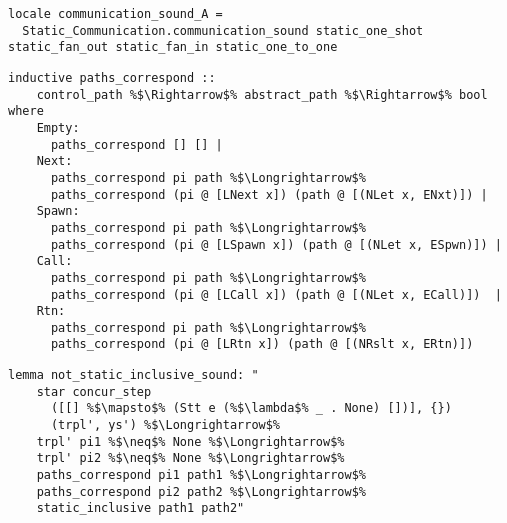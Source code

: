 \begin{lstlisting}[style=codestyle1, escapechar=\%]
locale communication_sound_A = 
  Static_Communication.communication_sound static_one_shot static_fan_out static_fan_in static_one_to_one
    \end{lstlisting}

\begin{lstlisting}[style=codestyle1, escapechar=\%]
  inductive paths_correspond ::
    control_path %$\Rightarrow$% abstract_path %$\Rightarrow$% bool where
    Empty:
      paths_correspond [] [] |
    Next:
      paths_correspond pi path %$\Longrightarrow$%
      paths_correspond (pi @ [LNext x]) (path @ [(NLet x, ENxt)]) |
    Spawn:
      paths_correspond pi path %$\Longrightarrow$%
      paths_correspond (pi @ [LSpawn x]) (path @ [(NLet x, ESpwn)]) |
    Call:
      paths_correspond pi path %$\Longrightarrow$%
      paths_correspond (pi @ [LCall x]) (path @ [(NLet x, ECall)])  |
    Rtn:
      paths_correspond pi path %$\Longrightarrow$%
      paths_correspond (pi @ [LRtn x]) (path @ [(NRslt x, ERtn)]) 
  \end{lstlisting}

\begin{lstlisting}[style=codestyle1, escapechar=\%]
  lemma not_static_inclusive_sound: "
    star concur_step
      ([[] %$\mapsto$% (Stt e (%$\lambda$% _ . None) [])], {})
      (trpl', ys') %$\Longrightarrow$% 
    trpl' pi1 %$\neq$% None %$\Longrightarrow$% 
    trpl' pi2 %$\neq$% None %$\Longrightarrow$% 
    paths_correspond pi1 path1 %$\Longrightarrow$%
    paths_correspond pi2 path2 %$\Longrightarrow$%
    static_inclusive path1 path2"

  \end{lstlisting}

